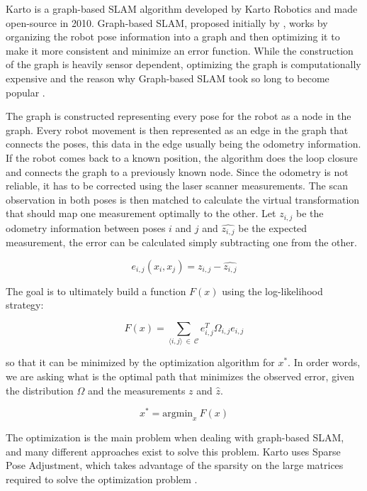Karto is a graph-based SLAM algorithm developed by Karto Robotics and made open-source in 2010. Graph-based SLAM, proposed initially by \citeauthor{lu1997globally}, works by organizing the robot pose information into a graph and then optimizing it to make it more consistent and minimize an error function. While the construction of the graph is heavily sensor dependent, optimizing the graph is computationally expensive and the reason why Graph-based SLAM took so long to become popular \cite{grisetti2010tutorial}.

The graph is constructed representing every pose for the robot as a node in the graph. Every robot movement is then represented as an edge in the graph that connects the poses, this data in the edge usually being the odometry information. If the robot comes back to a known position, the algorithm does the loop closure and connects the graph to a previously known node. Since the odometry is not reliable, it has to be corrected using the laser scanner measurements. The scan observation in both poses is then matched to calculate the virtual transformation that should map one measurement optimally to the other. Let $z_{i,j}$ be the odometry information between poses $i$ and $j$ and $\hat{z_{i,j}}$ be the expected measurement, the error can be calculated simply subtracting one from the other.

\begin{equation}
    e_{i,j}(x_i, x_j) = z_{i,j} - \hat{z_{i,j}}
\end{equation}

The goal is to ultimately build a function $F(x)$ using the log-likelihood strategy:

\begin{equation}
    F(x) = \sum_{\langle i, j \rangle \ \in \ \mathcal{C}} e_{i,j}^T \Omega_{i,j} e_{i,j}
\end{equation}

so that it can be minimized by the optimization algorithm for $x^*$. In order words, we are asking what is the optimal path that minimizes the observed error, given the distribution $\Omega$ and the measurements $z$ and $\hat{z}$.

\begin{equation}
    x^* = \text{argmin}_x \ F(x)
\end{equation}

The optimization is the main problem when dealing with graph-based SLAM, and many different approaches exist to solve this problem. Karto uses Sparse Pose Adjustment, which takes advantage of the sparsity on the large matrices required to solve the optimization problem \cite{konolige2010efficient}.

